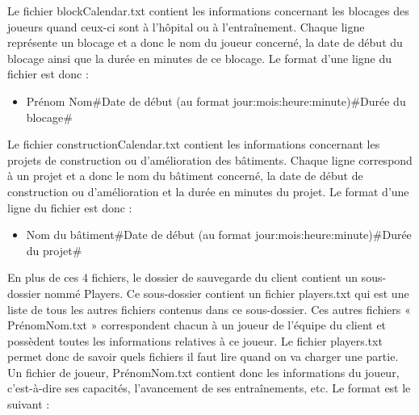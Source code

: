 \documentclass[a4paper,titlepage]{scrreprt}
\begin{document}
        Le fichier blockCalendar.txt contient les informations concernant les blocages des joueurs quand ceux-ci sont à l’hôpital ou à l’entraînement. Chaque ligne représente un blocage et a donc le nom du joueur concerné, la date de début du blocage ainsi que la durée en minutes de ce blocage. Le format d’une ligne du fichier est donc :\\

          \begin{itemize}
            \item Prénom Nom\#Date de début (au format jour:mois:heure:minute)\#Durée du blocage\#
          \end{itemize} 

        Le fichier constructionCalendar.txt contient les informations concernant les projets de construction ou d’amélioration des bâtiments. Chaque ligne correspond à un projet et a donc le nom du bâtiment concerné, la date de début de construction ou d’amélioration et la durée en minutes du projet. Le format d’une ligne du fichier est donc :\\

          \begin{itemize}
            \item Nom du bâtiment\#Date de début (au format jour:mois:heure:minute)\#Durée du projet\#
          \end{itemize} 

        En plus de ces 4 fichiers, le dossier de sauvegarde du client contient un sous-dossier nommé Players. Ce sous-dossier contient un fichier players.txt qui est une liste de tous les autres fichiers contenus dans ce sous-dossier. Ces autres fichiers « PrénomNom.txt » correspondent chacun à un joueur de l’équipe du client et possèdent toutes les informations relatives à ce joueur. Le fichier players.txt permet donc de savoir quels fichiers il faut lire quand on va charger une partie.\\

        Un fichier de joueur, PrénomNom.txt contient donc les informations du joueur, c’est-à-dire ses capacités, l’avancement de ses entraînements, etc. Le format est le suivant :\\
\end{document}
